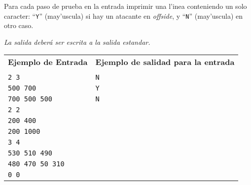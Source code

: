 \documentclass[a4paper,12pt]{article}
\begin{document}
 Para cada paso de prueba en la entrada imprimir una l'inea conteniendo un solo caracter: ``\verb|Y|'' (may'uscula) si hay un atacante en \emph{offside}, y ``\verb|N|'' (may'uscula) en otro caso.

\emph{La salida deberá ser escrita a la salida estandar.}\\

\begin{tabular}{|l|l|}
  \hline
  \textbf{Ejemplo de Entrada}&\textbf{Ejemplo de salidad para la entrada}\\
   &\\
 \verb|2 3| &\verb|N|\\
 \verb|500 700| & \verb|Y|\\
 \verb|700 500 500| & \verb|N|\\
 \verb|2 2|& \\
 \verb|200 400|& \\
 \verb|200 1000|&\\
 \verb|3 4|&\\
 \verb|530 510 490|&\\
 \verb|480 470 50 310|&\\
 \verb|0 0|&\\
  \hline
\end{tabular}
\end{document}
